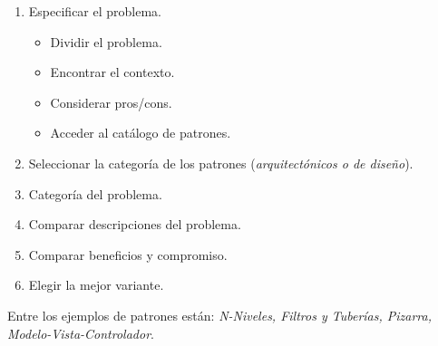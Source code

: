 \begin{enumerate}[noitemsep]
\item Especificar el problema.
  \begin{itemize}[noitemsep]
  \item Dividir el problema.
  \item Encontrar el contexto.
  \item Considerar pros/cons.
  \item Acceder al catálogo de patrones.
  \end{itemize}
\item Seleccionar la categoría de los patrones (\emph{arquitectónicos
  o de diseño}).
\item Categoría del problema.
\item Comparar descripciones del problema.
\item Comparar beneficios y compromiso.
\item Elegir la mejor variante.
\end{enumerate}

Entre los ejemplos de patrones están: \emph{N-Niveles, Filtros y
  Tuberías, Pizarra, Modelo-Vista-Controlador}.